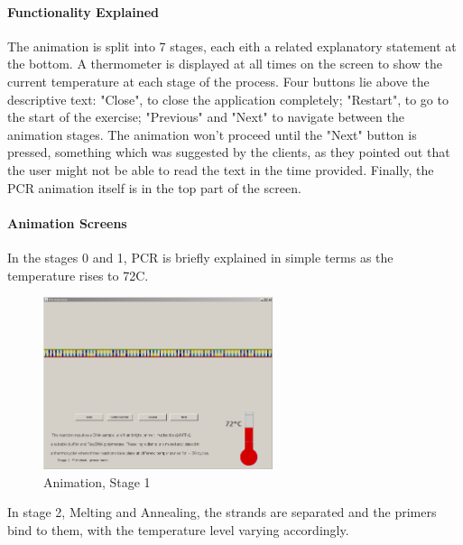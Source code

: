 \paragraph{Functionality Explained}
The animation is split into 7 stages, each eith a related explanatory statement at the bottom. A thermometer is displayed at all times on the screen to show the current temperature at each stage of the process. Four buttons lie above the descriptive text: "Close", to close the application completely; "Restart", to go to the start of the exercise; "Previous" and "Next" to navigate between the animation stages. The animation won't proceed until the "Next" button is pressed, something which was suggested by the clients, as they pointed out that the user might not be able to read the text in the time provided. Finally, the PCR animation itself is in the top part of the screen.

\paragraph{Animation Screens}

In the stages 0 and 1, PCR is briefly explained in simple terms as the temperature rises to 72\degree C.

\begin{figure}[h]
  \begin{center}
	\includegraphics[width=0.6\textwidth]{./images/AnimImpl/Stage1.png}
    \caption{
      \label{fig:AnimImpl:stage1}
      Animation, Stage 1
    }
  \end{center}
\end{figure}


In stage 2, Melting and Annealing, the strands are separated and the primers bind to them, with the temperature level varying accordingly.

